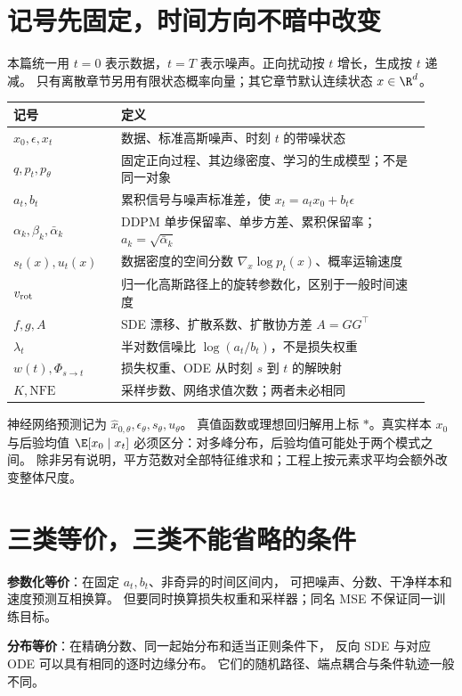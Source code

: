 \section{记号先固定，时间方向不暗中改变}

本篇统一用 $t=0$ 表示数据，$t=T$ 表示噪声。正向扰动按 $t$ 增长，生成按 $t$ 递减。
只有离散章节另用有限状态概率向量；其它章节默认连续状态 $x\in\R^d$。

\begin{longtable}{@{}p{0.24\linewidth}p{0.69\linewidth}@{}}
\toprule 记号 & 定义 \\ \midrule\endhead
$x_0,\epsilon,x_t$ & 数据、标准高斯噪声、时刻 $t$ 的带噪状态 \\
$q,p_t,p_\theta$ & 固定正向过程、其边缘密度、学习的生成模型；不是同一对象 \\
$a_t,b_t$ & 累积信号与噪声标准差，使 $x_t=a_tx_0+b_t\epsilon$ \\
$\alpha_k,\beta_k,\bar\alpha_k$ & DDPM 单步保留率、单步方差、累积保留率；$a_k=\sqrt{\bar\alpha_k}$ \\
$s_t(x),u_t(x)$ & 数据密度的空间分数 $\nabla_x\log p_t(x)$、概率运输速度 \\
$v_{\rm rot}$ & 归一化高斯路径上的旋转参数化，区别于一般时间速度 \\
$f,g,A$ & SDE 漂移、扩散系数、扩散协方差 $A=GG^\top$ \\
$\lambda_t$ & 半对数信噪比 $\log(a_t/b_t)$，不是损失权重 \\
$w(t),\Phi_{s\to t}$ & 损失权重、ODE 从时刻 $s$ 到 $t$ 的解映射 \\
$K,\mathrm{NFE}$ & 采样步数、网络求值次数；两者未必相同 \\
\bottomrule
\end{longtable}

神经网络预测记为 $\hat x_{0,\theta},\epsilon_\theta,s_\theta,u_\theta$。
真值函数或理想回归解用上标 $*$。真实样本 $x_0$ 与后验均值
$\E[x_0\mid x_t]$ 必须区分：对多峰分布，后验均值可能处于两个模式之间。
除非另有说明，平方范数对全部特征维求和；工程上按元素求平均会额外改变整体尺度。

\section{三类等价，三类不能省略的条件}

\textbf{参数化等价}：在固定 $a_t,b_t$、非奇异的时间区间内，
可把噪声、分数、干净样本和速度预测互相换算。
但要同时换算损失权重和采样器；同名 MSE 不保证同一训练目标。

\textbf{分布等价}：在精确分数、同一起始分布和适当正则条件下，
反向 SDE 与对应 ODE 可以具有相同的逐时边缘分布。
它们的随机路径、端点耦合与条件轨迹一般不同。

